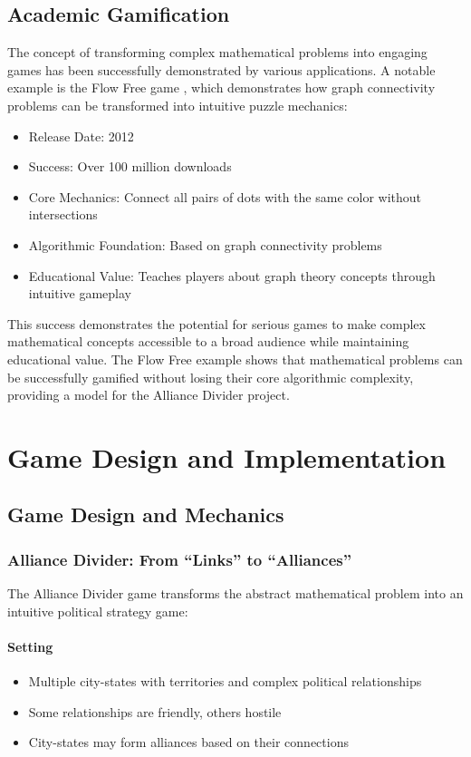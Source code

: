 \documentclass[english]{tudscrreprt}
\begin{document}
\section{Academic Gamification}
The concept of transforming complex mathematical problems into engaging games has been successfully demonstrated by various applications. A notable example is the Flow Free game \cite{flowfree2012}, which demonstrates how graph connectivity problems can be transformed into intuitive puzzle mechanics:

\begin{itemize}
  \item Release Date: 2012
  \item Success: Over 100 million downloads
  \item Core Mechanics: Connect all pairs of dots with the same color without intersections
  \item Algorithmic Foundation: Based on graph connectivity problems
  \item Educational Value: Teaches players about graph theory concepts through intuitive gameplay
\end{itemize}

This success demonstrates the potential for serious games to make complex mathematical concepts accessible to a broad audience while maintaining educational value. The Flow Free example shows that mathematical problems can be successfully gamified without losing their core algorithmic complexity, providing a model for the Alliance Divider project.

\chapter{Game Design and Implementation}

\section{Game Design and Mechanics}

\subsection{Alliance Divider: From ``Links'' to ``Alliances''}
The Alliance Divider game transforms the abstract mathematical problem into an intuitive political strategy game:

\subsubsection{Setting}
\begin{itemize}
  \item Multiple city-states with territories and complex political relationships
  \item Some relationships are friendly, others hostile
  \item City-states may form alliances based on their connections
\end{itemize}
\end{document}
